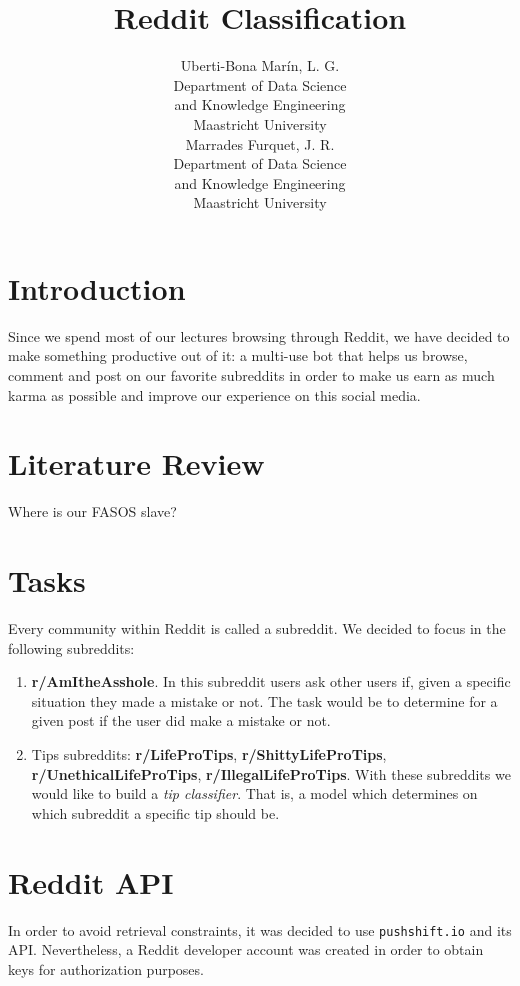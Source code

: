 \documentclass[11pt,a4paper]{article}
\title{Reddit Classification}
\author{Uberti-Bona Mar\'{i}n, L. G. \\
  Department of Data Science \\
  and Knowledge Engineering \\
  Maastricht University \\\And
  Marrades Furquet, J. R. \\
  Department of Data Science \\
  and Knowledge Engineering \\
  Maastricht University}
\date{}
\begin{document}
\maketitle

\section{Introduction}
\label{sec:introduction}
Since we spend most of our lectures browsing through Reddit, we have decided to make
something productive out of it: a multi-use bot that helps us browse, comment and post
on our favorite subreddits in order to make us earn as much karma as possible and
improve our experience on this social media.

\section{Literature Review}
\label{sec:literature_review}
Where is our FASOS slave?

\section{Tasks}
\label{sec:tasks}
Every community within Reddit is called a subreddit. We decided to focus in the
following subreddits:
\begin{enumerate}
	\item \textbf{r/AmItheAsshole}. In this subreddit users ask other users if, given a
	specific situation they made a mistake or not. The task would be to determine for a
	given post if the user did make a mistake or not.
	\item Tips subreddits: \textbf{r/LifeProTips}, \textbf{r/ShittyLifeProTips},
	\textbf{r/UnethicalLifeProTips}, \textbf{r/IllegalLifeProTips}. With these subreddits
	we would like to build a \textit{tip classifier}. That is, a model which determines on
    which subreddit a specific tip should be. 
\end{enumerate}

\section{Reddit API}
\label{sec:reddit_api}
In order to avoid retrieval constraints, it was decided to use \texttt{pushshift.io} and its
API. Nevertheless, a Reddit developer account was created in order to obtain keys for
authorization purposes.\\
\end{document}
